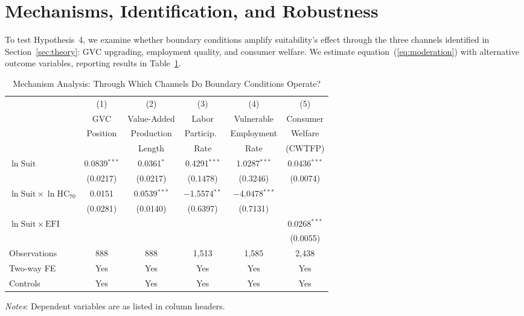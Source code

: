 \documentclass[12pt]{article}
\newcommand{\suit}{\mathrm{Suit}}
\newcommand{\hc}{\mathrm{HC}}
\begin{document}
\section{Mechanisms, Identification, and Robustness}
\label{sec:mechanisms}

To test Hypothesis~4, we examine whether boundary conditions
amplify suitability's effect through the three channels
identified in Section~\ref{sec:theory}: GVC upgrading,
employment quality, and consumer welfare.
We estimate equation~(\ref{eq:moderation}) with alternative
outcome variables, reporting results in Table~\ref{tab:mechanism}.

\begin{table}[H]
\centering
\begin{threeparttable}
\caption{Mechanism Analysis: Through Which Channels Do Boundary
         Conditions Operate?}
\label{tab:mechanism}
\small
\begin{tabular}{l*{5}{c}}
\toprule
 & (1) & (2) & (3) & (4) & (5) \\
 & GVC   & Value-Added & Labor    & Vulnerable & Consumer \\
 & Position & Production  & Particip.\ & Employment & Welfare \\
 &          & Length      & Rate       & Rate       & (CWTFP) \\
\midrule
$\ln \suit$
  & 0.0839$^{***}$ & 0.0361$^{*}$   & 0.4291$^{***}$
  & 1.0287$^{***}$ & 0.0436$^{***}$ \\
  & (0.0217) & (0.0217) & (0.1478) & (0.3246) & (0.0074) \\[4pt]
$\ln \suit \times \ln \hc_{70}$
  & 0.0151 & 0.0539$^{***}$ & $-$1.5574$^{**}$ & $-$4.0478$^{***}$ & \\
  & (0.0281) & (0.0140) & (0.6397) & (0.7131) & \\[4pt]
$\ln \suit \times \mathrm{EFI}$
  & & & & & 0.0268$^{***}$ \\
  & & & & & (0.0055) \\[4pt]
\midrule
Observations
  & 888 & 888 & 1,513 & 1,585 & 2,438 \\
Two-way FE   & Yes & Yes & Yes & Yes & Yes \\
Controls     & Yes & Yes & Yes & Yes & Yes \\
\bottomrule
\end{tabular}
\begin{tablenotes}
\footnotesize
\item \textit{Notes}: Dependent variables are as listed in column headers.

\end{tablenotes}
\end{threeparttable}
\end{table}
\end{document}

